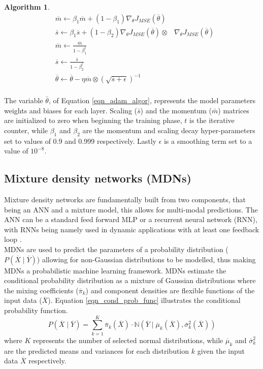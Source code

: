 \documentclass[a4paper,fleqn]{cas-dc}
\newtheorem{theorem}{Algorithm}
\begin{document}
\begin{theorem} 
\begin{equation}\label{eqn_adam_algor} 
\begin{split}
&\overline{m}\leftarrow \beta_1\overline{m}+(1-\beta_1)\nabla_{\theta}J_{MSE}(\overline{\theta})\\
&\overline{s}\leftarrow \beta_1\overline{s}+(1-\beta_2)\nabla_{\theta}J_{MSE}(\overline{\theta})\otimes&\nabla_{\theta}J_{MSE}(\overline{\theta})\\
&\overline{m}\leftarrow\frac{\overline{m}}{1-\beta_1^t} \\
&\overline{s}\leftarrow\frac{\overline{s}}{1-\beta_2^t}\\
&\overline{\theta}\leftarrow\overline{\theta}-\eta\overline{m}\otimes(\sqrt{\overline{s}+\epsilon})^{-1}\\
\end{split}
\end{equation}
\end{theorem}

The variable $\bar{\theta}$, of Equation \ref{eqn_adam_algor}, represents the model parameters weights and biases for each layer. Scaling ($\bar{s}$) and the momentum ($\bar{m}$) matrices are initialized to zero when beginning the training phase, $t$ is the iterative counter, while $\beta_1$ and $\beta_2$ are the momentum and scaling decay hyper-parameters set to values of 0.9 and 0.999 respectively. Lastly $\epsilon$ is a smoothing term set to a value of $10^{-8}$.

\subsection{Mixture density networks (MDNs)}
Mixture density networks are fundamentally built from two components, that being an ANN and a mixture model, this allows for multi-modal predictions. The ANN can be a standard feed forward MLP or a recurrent neural network (RNN), with RNNs being namely used in dynamic applications with at least one feedback loop \citep{Oko2015}.\\

MDNs are used to predict the parameters of a probability distribution ($P(\overline{X}\mid\overline{Y})$) allowing for non-Gaussian distributions to be modelled, thus making MDNs a probabilistic machine learning framework. MDNs estimate the conditional probability distribution as a mixture of Gaussian distributions where the mixing coefficients ($\overline{\pi}_k$) and component densities are flexible functions of the input data ($\overline{X}$). Equation \ref{eqn_cond_prob_func} illustrates the conditional probability function.
\begin{equation}\label{eqn_cond_prob_func}
P(\overline{X}\mid\overline{Y}) = \sum_{k=1}^K\overline{\pi}_k(\overline{X})\cdot \mathbb{N}(\overline{Y}\mid \overline{\mu}_k(\overline{X}),\overline{\sigma}^2_k(\overline{X}))
\end{equation}
where $K$ represents the number of selected normal distributions, while $\overline{\mu}_k$ and $\overline{\sigma}^2_k$ are the predicted means and variances for each distribution $k$ given the input data $\overline{X}$ respectively.\\
\end{document}
